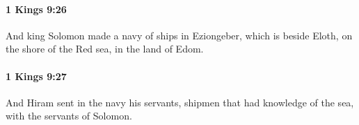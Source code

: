 		\paragraph{1 Kings 9:26} %
			\label{1KINGS-9-26}

			And king Solomon made a navy of ships in Eziongeber, which is beside Eloth, on the shore of the Red sea, in the land of Edom.


		\paragraph{1 Kings 9:27} %
			\label{1KINGS-9-27}

			And Hiram sent in the navy his servants, shipmen that had knowledge of the sea, with the servants of Solomon.


